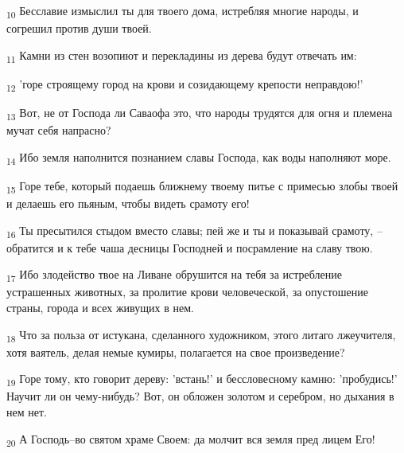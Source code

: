 \begin{tcolorbox}
\textsubscript{10} Бесславие измыслил ты для твоего дома, истребляя многие народы, и согрешил против души твоей.
\end{tcolorbox}
\begin{tcolorbox}
\textsubscript{11} Камни из стен возопиют и перекладины из дерева будут отвечать им:
\end{tcolorbox}
\begin{tcolorbox}
\textsubscript{12} 'горе строящему город на крови и созидающему крепости неправдою!'
\end{tcolorbox}
\begin{tcolorbox}
\textsubscript{13} Вот, не от Господа ли Саваофа это, что народы трудятся для огня и племена мучат себя напрасно?
\end{tcolorbox}
\begin{tcolorbox}
\textsubscript{14} Ибо земля наполнится познанием славы Господа, как воды наполняют море.
\end{tcolorbox}
\begin{tcolorbox}
\textsubscript{15} Горе тебе, который подаешь ближнему твоему питье с примесью злобы твоей и делаешь его пьяным, чтобы видеть срамоту его!
\end{tcolorbox}
\begin{tcolorbox}
\textsubscript{16} Ты пресытился стыдом вместо славы; пей же и ты и показывай срамоту, --обратится и к тебе чаша десницы Господней и посрамление на славу твою.
\end{tcolorbox}
\begin{tcolorbox}
\textsubscript{17} Ибо злодейство твое на Ливане обрушится на тебя за истребление устрашенных животных, за пролитие крови человеческой, за опустошение страны, города и всех живущих в нем.
\end{tcolorbox}
\begin{tcolorbox}
\textsubscript{18} Что за польза от истукана, сделанного художником, этого литаго лжеучителя, хотя ваятель, делая немые кумиры, полагается на свое произведение?
\end{tcolorbox}
\begin{tcolorbox}
\textsubscript{19} Горе тому, кто говорит дереву: 'встань!' и бессловесному камню: 'пробудись!' Научит ли он чему-нибудь? Вот, он обложен золотом и серебром, но дыхания в нем нет.
\end{tcolorbox}
\begin{tcolorbox}
\textsubscript{20} А Господь--во святом храме Своем: да молчит вся земля пред лицем Его!
\end{tcolorbox}
